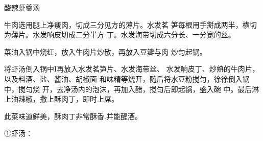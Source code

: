 \begin{recipe}{酸辣虾羹汤}

\ingredients



\cooking

\step 牛肉选用腿上净瘦肉，切成三分见方的薄片。水发茗 笋每根用手掰成两半，横切为薄片。水发响皮切成二分半方 丁。水发海带切成六分长、一分宽的丝。

\step 菜油入锅中烧红，放入牛肉片炒散，再放入豆瓣与肉 炒匀起锅。

\step 将虾汤倒入锅中I再放入水发茗笋片、水发海带丝、 水发响皮丁、炒熟的牛肉片，以及料酒、盐、酱油、胡椒面 和味精等烧开，随后将水豆粉搅匀，徐徐倒入锅中，搅匀烧 开，去净汤内的泡沫，再加入醋，搅匀后即起锅，盛入碗 中。最后淋上油辣椒，撒上酥肉丁，即时上席。

\notes

此菜味道鲜美，酥肉丁非常酥香.并能醒酒。

①虾汤：

\ingredients



\end{recipe}

